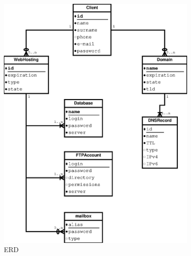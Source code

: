 \documentclass[11pt,a4paper]{article}
\begin{document}
    \begin{figure}[ht]
      \begin{center}
        \includegraphics[width=10cm]{erd}
        \caption{ERD}
      \end{center}
    \end{figure}
\end{document}
